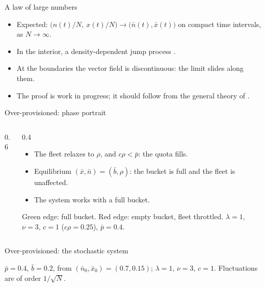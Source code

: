 \documentclass[aspectratio=169]{beamer}
\renewcommand{\cite}{\citep}
\newenvironment*{myitem}[1][1.5em]{\begin{itemize}\setlength{\itemsep}{#1}}{\end{itemize}}
\begin{document}
\begin{frame}{A law of large numbers}

	\begin{myitem}
		\item Expected: $\big(n(t)/N,\ x(t)/N\big) \to \big(\bar n(t),\bar x(t)\big)$ on compact time intervals, as $N\to\infty$.
		\item In the interior, a density-dependent jump process \cite{Kurtz1970}.
		\item At the boundaries the vector field is discontinuous: the limit \alert{slides} along them.
		\item The proof is \alert{work in progress}; it should follow from the general theory of \cite{EthierKurtz1986}.
	\end{myitem}
\end{frame}

\begin{frame}{Over-provisioned: phase portrait}

	\begin{columns}
		\begin{column}{0.6\textwidth}
			\begin{center}
			
			\end{center}
		\end{column}
		\begin{column}{0.4\textwidth}
			\begin{myitem}[1em]
				\item The fleet relaxes to $\rho$, and $c\rho<\bar p$: the quota \alert{fills}.
				\item Equilibrium $(\bar x,\bar n)=(\bar b,\rho)$: the bucket is full and the fleet is unaffected.
				\pause
				\item The system works with a \alert{full bucket}.
			\end{myitem}
			\vfill
			{\footnotesize Green edge: full bucket. Red edge: empty bucket, fleet throttled. $\lambda=1$, $\nu=3$, $c=1$ ($c\rho=0.25$), $\bar p=0.4$.}
		\end{column}
	\end{columns}
\end{frame}

\begin{frame}{Over-provisioned: the stochastic system}

	\begin{center}
		
	\end{center}

	\vfill
	{\footnotesize $\bar p=0.4$, $\bar b=0.2$, from $(\bar n_0,\bar x_0)=(0.7,0.15)$; $\lambda=1$, $\nu=3$, $c=1$. Fluctuations are of order $1/\sqrt N$.}
\end{frame}
\end{document}
